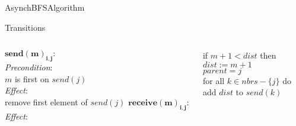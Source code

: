 \documentclass[pdf]{beamer}
\begin{document}
\begin{frame}{AsynchBFS}{Algorithm}
    \begin{block}{Transitions}
        \vspace{2mm}
        \begin{columns}
            $\mathbf{send(m)_{i, j}:}$\\ 
            \emph{Precondition}: \\ 
            \small $m$ is first on $send(j)$ \\
            \normalsize \emph{Effect}: \\
            \small remove first element of $send(j)$
            \normalsize $\mathbf{receive(m)_{i, j}: }$ \\
            \emph{Effect}: \\
            \small
            \begin{tcolorbox}[colframe=red]
                if $m+1 < dist$ then \\
                \hspace*{\parindent} $dist := m+1$ \\
                \hspace*{\parindent} $parent = j$ \\
                \hspace*{\parindent} for all $k \in nbrs - \{j\}$ do \\
                \hspace*{\parindent} \hspace*{\parindent} add $dist$ to $send(k)$ \\
            \end{tcolorbox}
        \end{columns}
    \end{block}
\end{frame}
\end{document}
